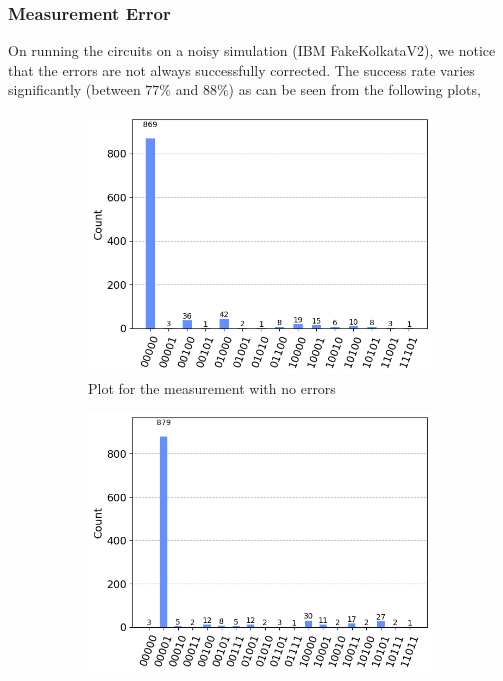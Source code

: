 \documentclass[11pt]{article}
\begin{document}
\subsubsection{Measurement Error}
On running the circuits on a noisy simulation (IBM FakeKolkataV2), we notice that the errors are not always successfully corrected. The success rate varies significantly (between $77\%$ and $88\%$) as can be seen from the following plots,
\begin{figure}[h!]
    \begin{subfigure}{0.5\linewidth}
        \includegraphics[width=\linewidth]{outputs/measure_5_none.png}
        \caption{Plot for the measurement with no errors}
    \end{subfigure}
    \begin{subfigure}{0.5\linewidth}
        \includegraphics[width=\linewidth]{outputs/measure_5_0.png}

\end{subfigure}
\end{figure}
\end{document}
